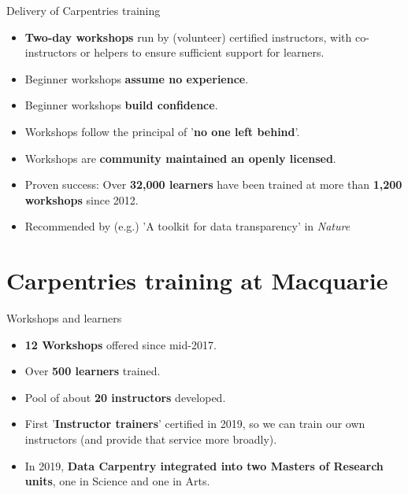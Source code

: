 \documentclass[aspectratio=169, 11pt]{beamer} %
\begin{document}
\begin{frame}{Delivery of Carpentries training}
  \begin{itemize}[label=\textbullet]
    \item \textbf{Two-day workshops} run by (volunteer) certified instructors, with co-instructors or helpers to ensure sufficient support for learners.
    \item Beginner workshops \textbf{assume no experience}.
    \item Beginner workshops \textbf{build confidence}.
    \item Workshops follow the principal of '\textbf{no one left behind}'.
    \item Workshops are \textbf{community maintained an openly licensed}.
    \item Proven success: Over \textbf{32,000 learners} have been trained at more than \textbf{1,200 workshops} since 2012.
    \item Recommended by (e.g.) 'A toolkit for data transparency' in \textit{Nature} \cite{Perkel2018-rw}
  \end{itemize}
\end{frame}

\section{Carpentries training at Macquarie}

\begin{frame}{Workshops and learners}
  \begin{itemize}[label=\textbullet]
    \item \textbf{12 Workshops} offered since mid-2017.
    \item Over \textbf{500 learners} trained.
    \item Pool of about \textbf{20 instructors} developed.
    \item First '\textbf{Instructor trainers}' certified in 2019, so we can train our own instructors (and provide that service more broadly).
    \item In 2019, \textbf{Data Carpentry integrated into two Masters of Research units}, one in Science and one in Arts.
  \end{itemize}
\end{frame}
\end{document}
